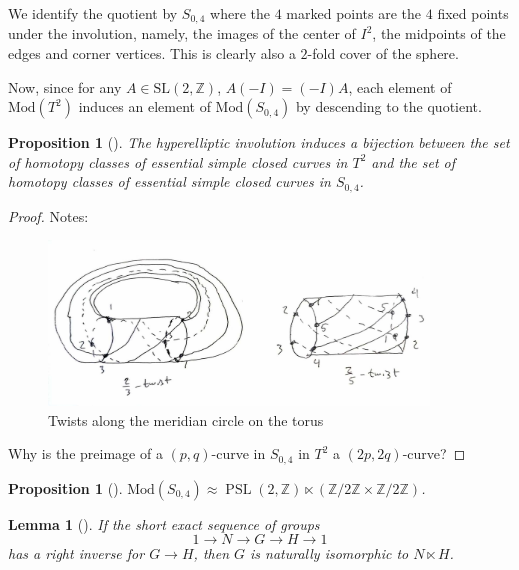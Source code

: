 \documentclass[reqno]{amsart}
\newtheorem{lemma}[theorem]{Lemma}
\newtheorem{proposition}[theorem]{Proposition}
\theoremstyle{definition}
\theoremstyle{remark}
\DeclareMathOperator{\PSL}{PSL}
\newcommand{\SL}{{\mathrm{SL}}}
\newcommand{\Mod}{{\mathrm{Mod}}}
\begin{document}
We identify the quotient
by $S_{0,4}$ where the $4$ marked points are
the $4$ fixed points under the involution, namely, the images
of the
center of $I^2$, the midpoints of the edges and corner vertices.
This is clearly also a $2$-fold cover of the sphere.

Now, since for any $A \in \SL (2,\mathbb{Z})$,
$A (-I) = (-I) A$,
each element of $\Mod \left( T^2 \right) $ induces
an element of $\Mod \left( S_{0,4} \right) $ by
descending to the quotient.


\begin{proposition}[]
    The hyperelliptic involution induces a bijection
    between the set of homotopy classes of essential
    simple closed curves in $T^2$ and the
    set of homotopy classes of essential simple closed 
    curves in $S_{0,4}$.
\end{proposition}

\begin{proof}
    Notes:

    \begin{figure}[htpb]
        \centering
        \includegraphics[width=0.9\textwidth]{twists-along-curves-on-torus.jpg}
        \caption{Twists along the meridian circle on the torus}
        \label{fig:twists-along-curves-on-torus-jpg}
    \end{figure}


    Why is the preimage of a $\left( p,q \right) $-curve in
    $S_{0,4}$ in $T^2$ a $\left( 2p,2q \right) $-curve?

\end{proof}

\begin{proposition}[]\label{mcg-of-4-punctured-sphere}
    $\Mod \left( S_{0,4} \right) \approx
    \PSL \left( 2, \mathbb{Z} \right) \ltimes
    \left( \mathbb{Z}/ 2 \mathbb{Z} \times 
    \mathbb{Z} / 2 \mathbb{Z} \right) $.
\end{proposition}


\begin{lemma}[]
    If the short exact sequence of groups
    \[
    1 \to N \to G \to H \to 1
    \] 
    has a right inverse for $G \to H$, then
    $G$ is naturally isomorphic to
    $N \ltimes H$.
\end{lemma}
\end{document}
